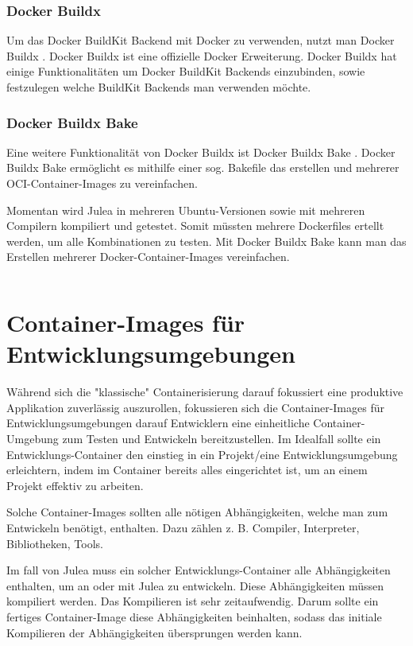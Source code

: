 \subsubsection{Docker Buildx}

Um das Docker BuildKit Backend mit Docker zu verwenden, nutzt man Docker Buildx \cite{dockerDockerBuildx}. Docker Buildx ist eine offizielle Docker Erweiterung. Docker Buildx hat einige Funktionalitäten um Docker BuildKit Backends einzubinden, sowie festzulegen welche BuildKit Backends man verwenden möchte.

\subsubsection{Docker Buildx Bake}

Eine weitere Funktionalität von Docker Buildx ist Docker Buildx Bake \cite{dockerBake}. Docker Buildx Bake ermöglicht es mithilfe einer sog. Bakefile das erstellen und mehrerer OCI-Container-Images zu vereinfachen.

Momentan wird Julea in mehreren Ubuntu-Versionen sowie mit mehreren Compilern kompiliert und getestet. Somit müssten mehrere Dockerfiles ertellt werden, um alle Kombinationen zu testen. Mit Docker Buildx Bake kann man das Erstellen mehrerer Docker-Container-Images vereinfachen.

\inputminted{./lexers/docker-bake-lexer.py}{./code-examples/docker-bake.example.hcl}

\section{Container-Images für Entwicklungsumgebungen}

Während sich die "klassische" Containerisierung darauf fokussiert eine produktive Applikation zuverlässig auszurollen, fokussieren sich die Container-Images für Entwicklungsumgebungen darauf Entwicklern eine einheitliche Container-Umgebung zum Testen und Entwickeln bereitzustellen. Im Idealfall sollte ein Entwicklungs-Container den einstieg in ein Projekt/eine Entwicklungsumgebung erleichtern, indem im Container bereits alles eingerichtet ist, um an einem Projekt effektiv zu arbeiten.

Solche Container-Images sollten alle nötigen Abhängigkeiten, welche man zum Entwickeln benötigt, enthalten. Dazu zählen z. B. Compiler, Interpreter, Bibliotheken, Tools.

Im fall von Julea muss ein solcher Entwicklungs-Container alle Abhängigkeiten enthalten, um an oder mit Julea zu entwickeln. Diese Abhängigkeiten müssen kompiliert werden. Das Kompilieren ist sehr zeitaufwendig. Darum sollte ein fertiges Container-Image diese Abhängigkeiten beinhalten, sodass das initiale Kompilieren der Abhängigkeiten übersprungen werden kann.

